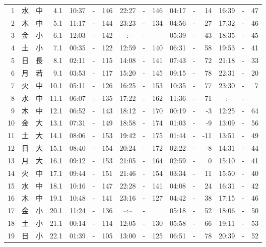 \documentclass[12pt.a4j]{jsarticle}
\begin{document}
\begin{center}
\begin{table}[ht]
\begin{tabular}{|rc|cr|ccrccr|ccrccr|}
 \hline
 1 & 水 & 中 &  4.1 &  10:37 &-& 146  &  22:27 &-& 146  &   04:17 &-&  14  &   16:39 &-&  47  \\
 2 & 木 & 中 &  5.1 &  11:17 &-& 144  &  23:23 &-& 134  &   04:56 &-&  27  &   17:32 &-&  46  \\
 3 & 金 & 小 &  6.1 &  12:03 &-& 142  &  --:-- &-&     &   05:39 &-&  43  &   18:35 &-&  45  \\
 4 & 土 & 小 &  7.1 &  00:35 &-& 122  &  12:59 &-& 140  &   06:31 &-&  58  &   19:53 &-&  41  \\
 5 & 日 & 長 &  8.1 &  02:11 &-& 115  &  14:08 &-& 141  &   07:43 &-&  72  &   21:18 &-&  33  \\
 6 & 月 & 若 &  9.1 &  03:53 &-& 117  &  15:20 &-& 145  &   09:15 &-&  78  &   22:31 &-&  20  \\
 7 & 火 & 中 & 10.1 &  05:11 &-& 126  &  16:25 &-& 153  &   10:35 &-&  77  &   23:30 &-&   7  \\
 8 & 水 & 中 & 11.1 &  06:07 &-& 135  &  17:22 &-& 162  &   11:36 &-&  71  &   --:-- &-&     \\
 9 & 木 & 中 & 12.1 &  06:52 &-& 143  &  18:12 &-& 170  &   00:19 &-&  -3  &   12:25 &-&  64  \\
10 & 金 & 大 & 13.1 &  07:31 &-& 149  &  18:58 &-& 174  &   01:03 &-&  -9  &   13:09 &-&  56  \\
11 & 土 & 大 & 14.1 &  08:06 &-& 153  &  19:42 &-& 175  &   01:44 &-& -11  &   13:51 &-&  49  \\
12 & 日 & 大 & 15.1 &  08:40 &-& 154  &  20:24 &-& 172  &   02:22 &-&  -8  &   14:31 &-&  44  \\
13 & 月 & 大 & 16.1 &  09:12 &-& 153  &  21:05 &-& 164  &   02:59 &-&   0  &   15:10 &-&  41  \\
14 & 火 & 中 & 17.1 &  09:44 &-& 151  &  21:46 &-& 154  &   03:34 &-&  11  &   15:50 &-&  40  \\
15 & 水 & 中 & 18.1 &  10:16 &-& 147  &  22:28 &-& 141  &   04:08 &-&  24  &   16:31 &-&  42  \\
16 & 木 & 中 & 19.1 &  10:48 &-& 141  &  23:16 &-& 127  &   04:42 &-&  38  &   17:15 &-&  46  \\
17 & 金 & 小 & 20.1 &  11:24 &-& 136  &  --:-- &-&     &   05:18 &-&  52  &   18:06 &-&  50  \\
18 & 土 & 小 & 21.1 &  00:14 &-& 114  &  12:05 &-& 130  &   05:58 &-&  66  &   19:11 &-&  53  \\
19 & 日 & 小 & 22.1 &  01:39 &-& 105  &  13:00 &-& 125  &   06:51 &-&  78  &   20:39 &-&  52  \\

\end{tabular}
\end{table}
\end{center}
\end{document}
